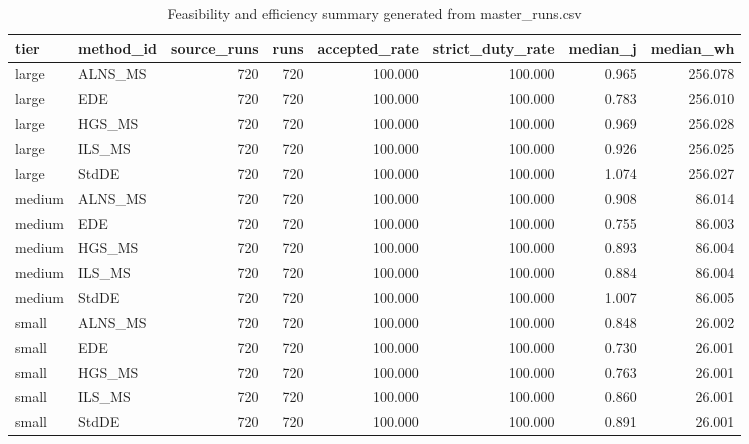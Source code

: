 \begin{table}[!t]
\centering
\caption{Feasibility and efficiency summary generated from master_runs.csv}
\label{tab:feasibility_summary_generated}
\begin{tabular}{llrrrrrr}
\toprule
tier & method_id & source_runs & runs & accepted_rate & strict_duty_rate & median_j & median_wh \\
\midrule
large & ALNS_MS & 720 & 720 & 100.000 & 100.000 & 0.965 & 256.078 \\
large & EDE & 720 & 720 & 100.000 & 100.000 & 0.783 & 256.010 \\
large & HGS_MS & 720 & 720 & 100.000 & 100.000 & 0.969 & 256.028 \\
large & ILS_MS & 720 & 720 & 100.000 & 100.000 & 0.926 & 256.025 \\
large & StdDE & 720 & 720 & 100.000 & 100.000 & 1.074 & 256.027 \\
medium & ALNS_MS & 720 & 720 & 100.000 & 100.000 & 0.908 & 86.014 \\
medium & EDE & 720 & 720 & 100.000 & 100.000 & 0.755 & 86.003 \\
medium & HGS_MS & 720 & 720 & 100.000 & 100.000 & 0.893 & 86.004 \\
medium & ILS_MS & 720 & 720 & 100.000 & 100.000 & 0.884 & 86.004 \\
medium & StdDE & 720 & 720 & 100.000 & 100.000 & 1.007 & 86.005 \\
small & ALNS_MS & 720 & 720 & 100.000 & 100.000 & 0.848 & 26.002 \\
small & EDE & 720 & 720 & 100.000 & 100.000 & 0.730 & 26.001 \\
small & HGS_MS & 720 & 720 & 100.000 & 100.000 & 0.763 & 26.001 \\
small & ILS_MS & 720 & 720 & 100.000 & 100.000 & 0.860 & 26.001 \\
small & StdDE & 720 & 720 & 100.000 & 100.000 & 0.891 & 26.001 \\
\bottomrule
\end{tabular}

\end{table}